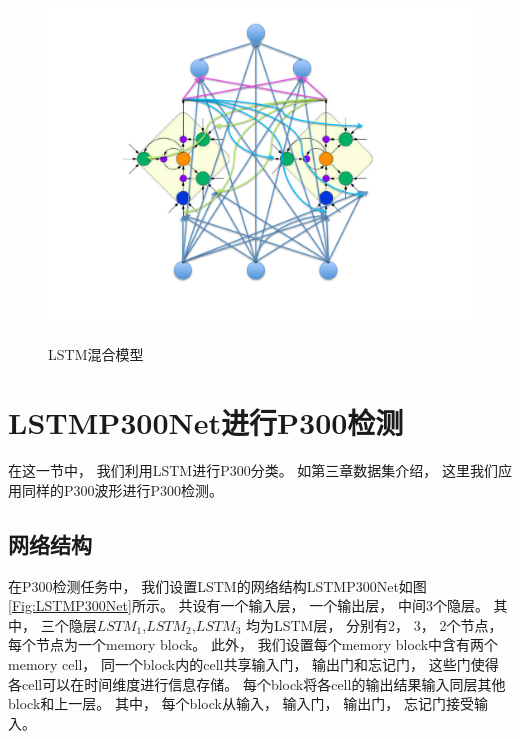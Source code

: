 \begin{figure}[htb]
  \centering
  \includegraphics[scale = 0.5]{Pictures/LSTM/lstm_mixture_model.pdf}\\
  \caption{LSTM混合模型}\label{Fig:lstm_mixture}
\end{figure}



\section{LSTMP300Net进行P300检测}

在这一节中， 我们利用LSTM进行P300分类。 如第三章数据集介绍， 这里我们应用同样的P300波形进行P300检测。 

\subsection{网络结构}
在P300检测任务中， 我们设置LSTM的网络结构LSTMP300Net如图\ref{Fig:LSTMP300Net}所示。 共设有一个输入层， 一个输出层， 中间3个隐层。 其中， 三个隐层$LSTM_1$,$LSTM_2$,$LSTM_3$ 均为LSTM层， 分别有2， 3， 2个节点， 每个节点为一个memory block。 此外， 我们设置每个memory block中含有两个memory cell， 同一个block内的cell共享输入门， 输出门和忘记门， 这些门使得各cell可以在时间维度进行信息存储。 每个block将各cell的输出结果输入同层其他block和上一层。 其中， 每个block从输入， 输入门， 输出门， 忘记门接受输入。 


